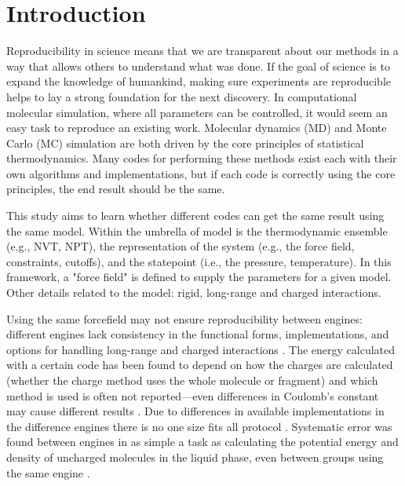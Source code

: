 \section{Introduction}
Reproducibility in science means that we are transparent about our methods in a way that allows others to understand what was done.
If the goal of science is to expand the knowledge of humankind, making sure experiments are reproducible helps to lay a strong foundation for the next discovery.
In computational molecular simulation, where all parameters can be controlled, it would seem an easy task to reproduce an existing work.
Molecular dynamics (MD) and Monte Carlo (MC) simulation are both driven by the core principles of statistical thermodynamics.
Many codes for performing these methods exist each with their own algorithms and implementations, but if each code is correctly using the core principles, the end result should be the same.

This study aims to learn whether different codes can get the same result using the same model.
Within the umbrella of model is the thermodynamic ensemble (e.g., NVT, NPT), the representation of the system (e.g., the force field, constraints, cutoffs), and the statepoint (i.e., the pressure, temperature).
In this framework, a "force field" is defined to supply the parameters for a given model.
Other details related to the model: rigid, long-range and charged interactions.

Using the same forcefield may not ensure reproducibility between engines: different engines lack consistency in the functional forms, implementations, and options for handling long-range and charged interactions \citep{Rizzi2020}. 
The energy calculated with a certain code has been found to depend on how the charges are calculated (whether the charge method uses the whole molecule or fragment) and which method is used is often not reported---even differences in Coulomb's constant may cause different results \citep{Shirts2017}.
Due to differences in available implementations in the difference engines there is no one size fits all protocol \citep{Loeffler2018}.
Systematic error was found between engines in as simple a task as calculating the potential energy and density of uncharged molecules in the liquid phase, even between groups using the same engine \citep{Schappals2017}.

